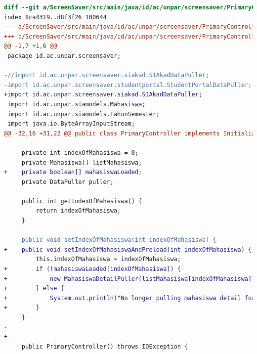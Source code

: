 \begin{lstlisting}[language=diff, caption=Perbedaan kode dosen dengan mahasiswa, label=diff_dosen_mahasiswa]
diff --git a/ScreenSaver/src/main/java/id/ac/unpar/screensaver/PrimaryController.java b/ScreenSaver/src/main/java/id/ac/unpar/screensaver/PrimaryController.java
index 8ca4319..d8f3f26 100644
--- a/ScreenSaver/src/main/java/id/ac/unpar/screensaver/PrimaryController.java
+++ b/ScreenSaver/src/main/java/id/ac/unpar/screensaver/PrimaryController.java
@@ -1,7 +1,6 @@
 package id.ac.unpar.screensaver;
 
-//import id.ac.unpar.screensaver.siakad.SIAkadDataPuller;
-import id.ac.unpar.screensaver.studentportal.StudentPortalDataPuller;
+import id.ac.unpar.screensaver.siakad.SIAkadDataPuller;
 import id.ac.unpar.siamodels.Mahasiswa;
 import id.ac.unpar.siamodels.TahunSemester;
 import java.io.ByteArrayInputStream;
@@ -32,16 +31,22 @@ public class PrimaryController implements Initializable {
 
     private int indexOfMahasiswa = 0;
     private Mahasiswa[] listMahasiswa;
+    private boolean[] mahasiswaLoaded;
     private DataPuller puller;
 
     public int getIndexOfMahasiswa() {
         return indexOfMahasiswa;
     }
 
-    public void setIndexOfMahasiswa(int indexOfMahasiswa) {
+    public void setIndexOfMahasiswaAndPreload(int indexOfMahasiswa) {
         this.indexOfMahasiswa = indexOfMahasiswa;
+        if (!mahasiswaLoaded[indexOfMahasiswa]) {
+            new MahasiswaDetailPuller(listMahasiswa[indexOfMahasiswa]).start();
+        } else {
+            System.out.println("No longer pulling mahasiswa detail for " + listMahasiswa[indexOfMahasiswa].getNama() + " because already pulled before");
+        }
     }
-
+    
     public PrimaryController() throws IOException {
 

\end{lstlisting}
